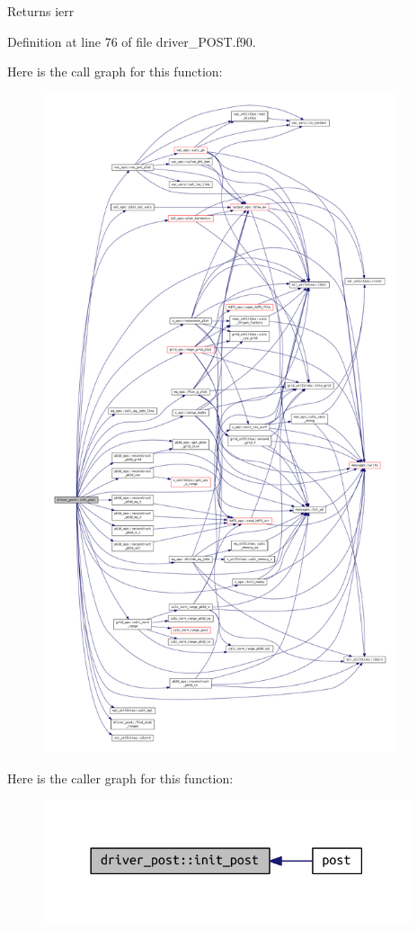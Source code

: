 \begin{DoxyReturn}{Returns}
ierr 
\end{DoxyReturn}


Definition at line 76 of file driver\+\_\+\+P\+O\+S\+T.\+f90.

Here is the call graph for this function\+:
\nopagebreak
\begin{figure}[H]
\begin{center}
\leavevmode
\includegraphics[height=550pt]{namespacedriver__post_af527706d4e696d4e507443d2f74194ef_cgraph}
\end{center}
\end{figure}
Here is the caller graph for this function\+:\nopagebreak
\begin{figure}[H]
\begin{center}
\leavevmode
\includegraphics[width=306pt]{namespacedriver__post_af527706d4e696d4e507443d2f74194ef_icgraph}
\end{center}
\end{figure}
